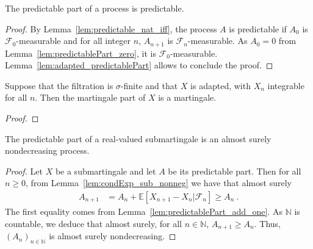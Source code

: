 \begin{lemma}\label{lem:predictable_predictablePart}
  \mathlibok
The predictable part of a process is predictable.
\end{lemma}

\begin{proof}  
By Lemma~\ref{lem:predictable_nat_iff}, the process $A$ is predictable if $A_0$ is $\mathcal{F}_0$-measurable and for all integer $n$, $A_{n+1}$ is $\mathcal{F}_n$-measurable. As $A_0 = 0$ from Lemma~\ref{lem:predictablePart_zero}, it is $\mathcal{F}_0$-measurable. Lemma~\ref{lem:adapted_predictablePart} allows to conclude the proof.
\end{proof}


\begin{lemma}\label{lem:martingale_martingalePart}
  \mathlibok
Suppose that the filtration is $\sigma$-finite and that $X$ is adapted, with $X_n$ integrable for all $n$.
Then the martingale part of $X$ is a martingale.
\end{lemma}

\begin{proof}
\end{proof}


\begin{lemma}\label{lem:Submartingale.monotone_predictablePart}
  \mathlibok
The predictable part of a real-valued submartingale is an almost surely nondecreasing process.
\end{lemma}

\begin{proof}  
Let $X$ be a submartingale and let $A$ be its predictable part. Then for all $n \geq 0$, from Lemma~\ref{lem:condExp_sub_nonneg} we have that almost surely
\begin{align*}
  A_{n+1} &= A_n + \mathbb{E}\left[ X_{n+1} - X_n | \mathcal{F}_n \right]
  \ge A_n
  \: .
\end{align*}
The first equality comes from Lemma~\ref{lem:predictablePart_add_one}. As $\mathbb{N}$ is countable, we deduce that almost surely, for all $n \in \mathbb{N}$, $A_{n+1} \ge A_n$.
Thus, $(A_n)_{n \in \mathbb{N}}$ is almost surely nondecreasing.
\end{proof}


